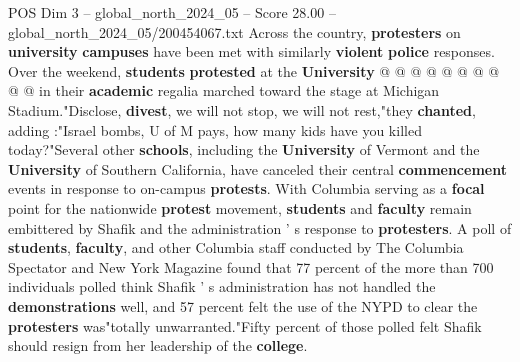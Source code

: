 \begin{textsample}{POS Dim 3 – global\_north\_2024\_05 – Score 28.00 – global\_north\_2024\_05/200454067.txt}
Across the country, \textbf{protesters} on \textbf{university} \textbf{campuses} have been met with similarly \textbf{violent} \textbf{police} responses.
Over the weekend, \textbf{students} \textbf{protested} at the \textbf{University} @ @ @ @ @ @ @ @ @ @ in their \textbf{academic} regalia marched toward the stage at Michigan Stadium."Disclose, \textbf{divest}, we will not stop, we will not rest,"they \textbf{chanted}, adding :"Israel bombs, U of M pays, how many kids have you killed today?"Several other \textbf{schools}, including the \textbf{University} of Vermont and the \textbf{University} of Southern California, have canceled their central \textbf{commencement} events in response to on-campus \textbf{protests}.
With Columbia serving as a \textbf{focal} point for the nationwide \textbf{protest} movement, \textbf{students} and \textbf{faculty} remain embittered by Shafik and the administration ' s response to \textbf{protesters}.
A poll of \textbf{students}, \textbf{faculty}, and other Columbia staff conducted by The Columbia Spectator and New York Magazine found that 77 percent of the more than 700 individuals polled think Shafik ' s administration has not handled the \textbf{demonstrations} well, and 57 percent felt the use of the NYPD to clear the \textbf{protesters} was"totally unwarranted."Fifty percent of those polled felt Shafik should resign from her leadership of the \textbf{college}.

\end{textsample}
